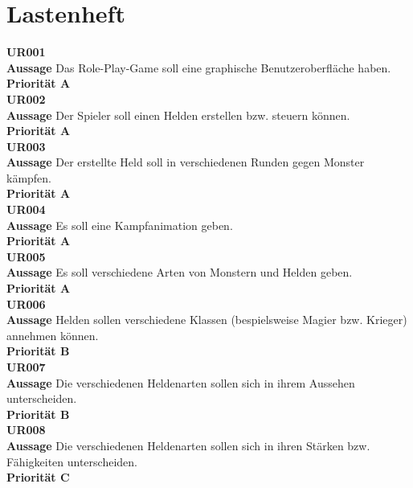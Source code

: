 \tableofcontents

\newpage

\section{Lastenheft}
\label{Lastenheft}

\textbf{UR001} \\
\textbf{Aussage} Das Role-Play-Game soll eine graphische Benutzeroberfläche haben. \\
\textbf{Priorität A} \\

\textbf{UR002} \\
\textbf{Aussage} Der Spieler soll einen Helden erstellen bzw. steuern können. \\
\textbf{Priorität A} \\

\textbf{UR003} \\
\textbf{Aussage} Der erstellte Held soll in verschiedenen Runden gegen Monster kämpfen. \\
\textbf{Priorität A} \\

\textbf{UR004} \\
\textbf{Aussage} Es soll eine Kampfanimation geben. \\
\textbf{Priorität A} \\

\textbf{UR005} \\
\textbf{Aussage} Es soll verschiedene Arten von Monstern und Helden geben. \\
\textbf{Priorität A} \\

\textbf{UR006} \\
\textbf{Aussage} Helden sollen verschiedene Klassen (bespielsweise Magier bzw. Krieger) annehmen können. \\
\textbf{Priorität B} \\

\textbf{UR007} \\
\textbf{Aussage} Die verschiedenen Heldenarten sollen sich in ihrem Aussehen unterscheiden. \\
\textbf{Priorität B} \\

\textbf{UR008} \\
\textbf{Aussage} Die verschiedenen Heldenarten sollen sich in ihren Stärken bzw. Fähigkeiten unterscheiden. \\
\textbf{Priorität C} \\

